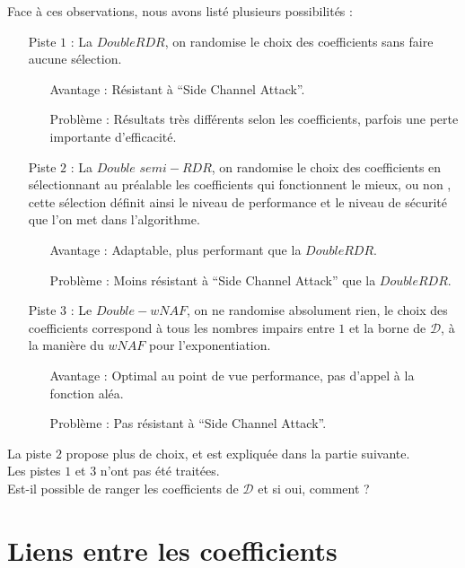 \documentclass[12pt, a4paper]{memoir}
\begin{document}
  Face à ces observations, nous avons listé plusieurs possibilités :
  \begin{itemize}
   \item [Piste $1$ :] La $DoubleRDR$, on randomise le choix des coefficients sans faire aucune sélection.
   \begin{itemize}
    \item [Avantage :] Résistant à ``Side Channel Attack''.
    \item [Problème :] Résultats très différents selon les coefficients, parfois une perte importante d'efficacité.
   \end{itemize}

   \item [Piste $2$ :] La $Double$ $semi-RDR$, on randomise le choix des coefficients en sélectionnant au préalable
   les coefficients qui fonctionnent le mieux, ou non , cette sélection définit ainsi le niveau de performance et
   le niveau de sécurité que l'on met dans l'algorithme.
   \begin{itemize}
    \item [Avantage :] Adaptable, plus performant que la $DoubleRDR$.
    \item [Problème :] Moins résistant à ``Side Channel Attack'' que la $DoubleRDR$.
   \end{itemize}
   
   \item [Piste $3$ :] Le $Double-wNAF$, on ne randomise absolument rien, le choix des coefficients correspond
   à tous les nombres impairs entre $1$ et la borne de $\mathcal{D}$, à la manière du $wNAF$ pour l'exponentiation.
   \begin{itemize}
    \item [Avantage :] Optimal au point de vue performance, pas d'appel à la fonction aléa.
    \item [Problème :] Pas résistant à ``Side Channel Attack''.
   \end{itemize}
  \end{itemize}
  
  La piste $2$ propose plus de choix, et est expliquée dans la partie suivante. \\
  Les pistes $1$ et $3$ n'ont pas été traitées. \\
  Est-il possible de ranger les coefficients de $\mathcal{D}$ et si oui, comment ?
  
  \section{Liens entre les coefficients}
  
\end{document}
